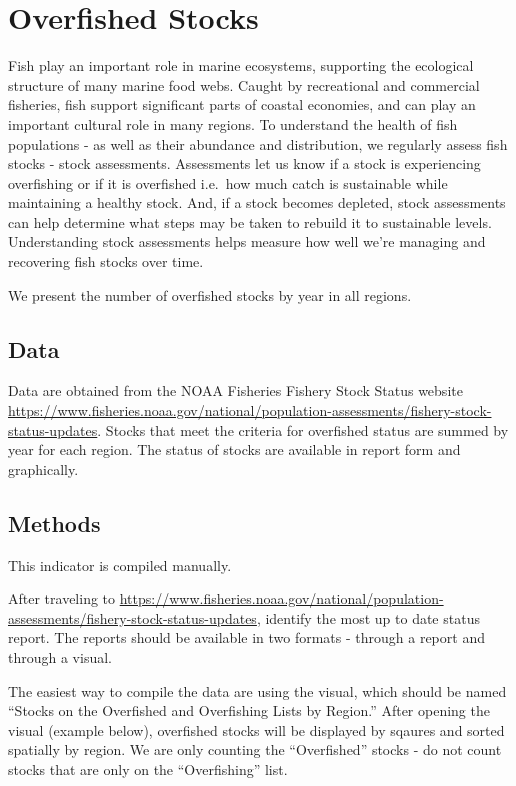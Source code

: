 \documentclass[
]{book}
\begin{document}
\hypertarget{overfished-stocks}{%
\chapter{Overfished Stocks}\label{overfished-stocks}}

Fish play an important role in marine ecosystems, supporting the ecological structure of many marine food webs. Caught by recreational and commercial fisheries, fish support significant parts of coastal economies, and can play an important cultural role in many regions. To understand the health of fish populations - as well as their abundance and distribution, we regularly assess fish stocks - stock assessments. Assessments let us know if a stock is experiencing overfishing or if it is overfished i.e.~how much catch is sustainable while maintaining a healthy stock. And, if a stock becomes depleted, stock assessments can help determine what steps may be taken to rebuild it to sustainable levels. Understanding stock assessments helps measure how well we're managing and recovering fish stocks over time.

We present the number of overfished stocks by year in all regions.

\hypertarget{data-4}{%
\section{Data}\label{data-4}}

Data are obtained from the NOAA Fisheries Fishery Stock Status website \url{https://www.fisheries.noaa.gov/national/population-assessments/fishery-stock-status-updates}. Stocks that meet the criteria for overfished status are summed by year for each region. The status of stocks are available in report form and graphically.

\hypertarget{methods-4}{%
\section{Methods}\label{methods-4}}

This indicator is compiled manually.

After traveling to \url{https://www.fisheries.noaa.gov/national/population-assessments/fishery-stock-status-updates}, identify the most up to date status report. The reports should be available in two formats - through a report and through a visual.

The easiest way to compile the data are using the visual, which should be named ``Stocks on the Overfished and Overfishing Lists by Region.'' After opening the visual (example below), overfished stocks will be displayed by sqaures and sorted spatially by region. We are only counting the ``Overfished'' stocks - do not count stocks that are only on the ``Overfishing'' list.
\end{document}
